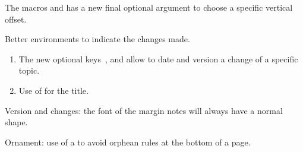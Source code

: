 \documentclass{tutodoc}
\begin{document}
\small

\begin{tdocnew}
	\item The macros  and  has a new final optional argument  to choose a specific vertical offset.

	\item Better environments to indicate the changes made.
	\begin{enumerate}
        \item The new optional keys \,,  and  allow to date and version a change of a specific topic.

        \item Use of  for the title.
	\end{enumerate}
\end{tdocnew}


\begin{tdocupdate}
	\item Version and changes: the font of the margin notes will always have a normal shape.

	\item Ornament: use of a \tdoclatexin{\cleaders} to avoid orphean rules at the bottom of a page.
\end{tdocupdate}
\end{document}
